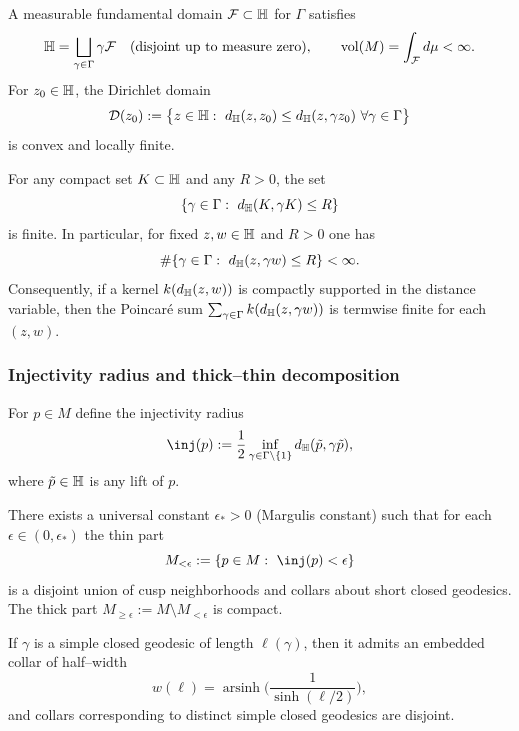 A measurable fundamental domain $\mathcal F\subset\mathbb{H}$ for $\Gamma$ satisfies
\begin{equation}\label{eq:fundamental-domain}
\mathbb{H}
=
\bigsqcup_{\gamma\in\Gamma}\gamma\mathcal F
\quad
\text{(disjoint up to measure zero)},
\qquad
\mathop{\mathrm{vol}}\nolimits(M)=\int_{\mathcal F}d\mu<\infty.
\end{equation}
For $z_{0}\in\mathbb{H}$, the Dirichlet domain
\begin{equation}\label{eq:dirichlet-domain}
\mathcal D(z_{0})
:=
\bigl\{z\in\mathbb{H}:\ d_{\mathbb{H}}(z,z_{0})\le d_{\mathbb{H}}(z,\gamma z_{0})\ \forall \gamma\in\Gamma\bigr\}
\end{equation}
is convex and locally finite.

\begin{lemma}\label{lem:local-finiteness}
For any compact set $K\subset\mathbb{H}$ and any $R>0$, the set
\[
\{\gamma\in\Gamma:\ d_{\Hh}(K,\gamma K)\le R\}
\]
is finite. In particular, for fixed $z,w\in\mathbb{H}$ and $R>0$ one has
\[
\#\{\gamma\in\Gamma:\ d_{\Hh}(z,\gamma w)\le R\}<\infty.
\]
Consequently, if a kernel $k(d_{\mathbb{H}}(z,w))$ is compactly supported in the distance variable,
then the Poincar\'e sum $\sum_{\gamma\in\Gamma}k(d_{\mathbb{H}}(z,\gamma w))$ is termwise finite for each $(z,w)$.
\end{lemma}

\subsubsection{Injectivity radius and thick--thin decomposition}

For $p\in M$ define the injectivity radius
\begin{equation}\label{eq:inj-def}
\inj(p)
:=
\frac12\inf_{\gamma\in\Gamma\setminus\{1\}}
d_{\Hh}(\tilde p,\gamma\tilde p),
\end{equation}
where $\tilde p\in\mathbb{H}$ is any lift of $p$.

There exists a universal constant $\epsilon_{*}>0$ (Margulis constant) such that for each
$\epsilon\in(0,\epsilon_{*})$ the thin part
\begin{equation}\label{eq:thin-part}
M_{<\epsilon}
:=
\{p\in M:\ \inj(p)<\epsilon\}
\end{equation}
is a disjoint union of cusp neighborhoods and collars about short closed geodesics.
The thick part $M_{\ge\epsilon}:=M\setminus M_{<\epsilon}$ is compact.

If $\gamma$ is a simple closed geodesic of length $\ell(\gamma)$, then it admits an embedded collar
of half--width
\begin{equation}\label{eq:collar-width}
w(\ell)
=
\operatorname{arsinh}\!\Big(\frac{1}{\sinh(\ell/2)}\Big),
\end{equation}
and collars corresponding to distinct simple closed geodesics are disjoint.

